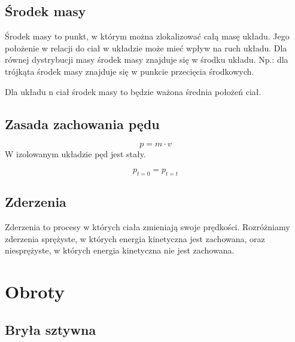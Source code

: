 \documentclass{../notatki}
\begin{document}
\subsection{Środek masy}

Środek masy to punkt, w którym można zlokalizować całą masę układu. Jego
położenie w relacji do ciał w układzie może mieć wpływ na ruch układu.
Dla równej dystrybucji masy środek masy znajduje się w środku układu.
Np.: dla trójkąta środek masy znajduje się w punkcie przecięcia środkowych.

\begin{figure*}[h]
  \centering
\end{figure*}

Dla układu n ciał środek masy to będzie ważona średnia położeń ciał.

\subsection{Zasada zachowania pędu}

$$
p = m \cdot v
$$
W izolowanym układzie pęd jest stały.

$$
p_{t=0} = p_{t=t}
$$

\subsection{Zderzenia}

Zderzenia to procesy w których ciała zmieniają swoje prędkości. Rozróżniamy
zderzenia sprężyste, w których energia kinetyczna jest zachowana, oraz
niesprężyste, w których energia kinetyczna nie jest zachowana.

\section{Obroty}

\subsection{Bryła sztywna}
\end{document}
